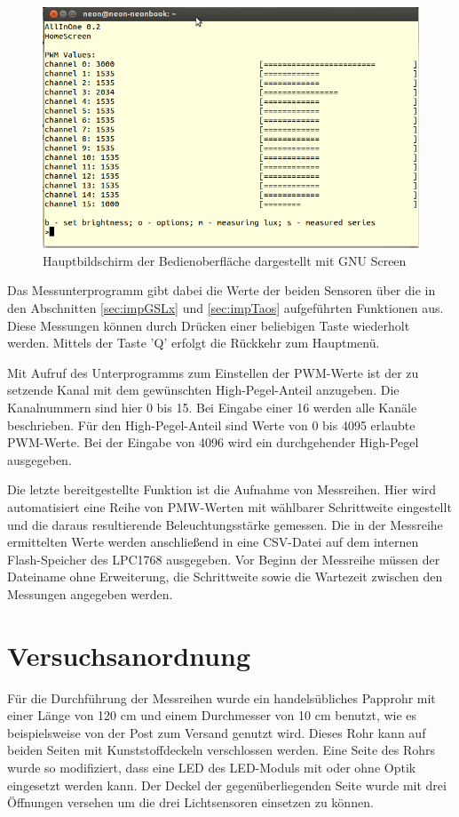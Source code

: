 \documentclass[a4paper,12pt]{scrartcl}
\begin{document}
\begin{figure}[htb]
\begin{center}
\includegraphics[width=0.7\hsize]{./images/messoftware.png}
\end{center}
\caption{\label{fig:gui}Hauptbildschirm der Bedienoberfläche dargestellt mit GNU Screen}
\end{figure}

Das Messunterprogramm gibt dabei die Werte der beiden Sensoren über die in den Abschnitten \ref{sec:impGSLx} und \ref{sec:impTaos} aufgeführten Funktionen aus. Diese Messungen können durch Drücken einer beliebigen Taste wiederholt werden. Mittels der Taste ’Q’ erfolgt die Rückkehr zum Hauptmenü.

Mit Aufruf des Unterprogramms zum Einstellen der PWM-Werte ist der zu setzende Kanal mit dem gewünschten High-Pegel-Anteil anzugeben. Die Kanalnummern sind hier 0 bis 15. Bei Eingabe einer 16 werden alle Kanäle beschrieben. Für den High-Pegel-Anteil sind Werte von 0 bis 4095 erlaubte PWM-Werte. Bei der Eingabe von 4096 wird ein durchgehender High-Pegel ausgegeben.

Die letzte bereitgestellte Funktion ist die Aufnahme von Messreihen. Hier wird automatisiert eine Reihe von PMW-Werten mit wählbarer Schrittweite eingestellt und die daraus resultierende Beleuchtungsstärke gemessen. Die in der Messreihe ermittelten Werte werden anschließend in eine CSV-Datei auf dem internen Flash-Speicher des LPC1768 ausgegeben. Vor Beginn der Messreihe müssen der Dateiname ohne Erweiterung, die Schrittweite sowie die Wartezeit zwischen den Messungen angegeben werden.

\clearpage
\section{Versuchsanordnung}
Für die Durchführung der Messreihen wurde ein handelsübliches Papprohr mit einer Länge von 120 cm und einem Durchmesser von 10 cm benutzt, wie es beispielsweise von der Post zum Versand genutzt wird. Dieses Rohr kann auf beiden Seiten mit Kunststoffdeckeln verschlossen werden. Eine Seite des Rohrs wurde so modifiziert, dass eine LED des LED-Moduls mit oder ohne Optik eingesetzt werden kann. Der Deckel der gegenüberliegenden Seite wurde mit drei Öffnungen versehen um die drei Lichtsensoren einsetzen zu können.
\end{document}
